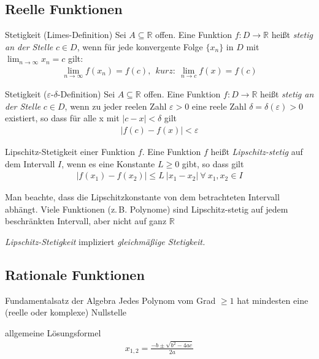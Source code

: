 \subsection{Reelle Funktionen}
\begin{karte}{Stetigkeit (Limes-Definition)}
	Sei \(A\subseteq\mathbb{R}\) offen. Eine Funktion \(f:D\to\mathbb{R}\) heißt \emph{stetig an der Stelle} \(c \in D\), wenn für jede konvergente Folge \(\{ x_{n} \} \) in \(D\) mit \(\displaystyle\lim_{n\to\infty} x_n = c\) gilt:
	\begin{align}
		\lim_{n\to\infty} f(x_n)=f(c),\ \ kurz:\ \lim_{n\to c}f(x)=f(c) 
	\end{align}
\end{karte}

\begin{karte}{Stetigkeit (\(\varepsilon\text{-}\delta \)-Definition)}
	Sei \(A\subseteq\mathbb{R}\) offen. Eine Funktion \(f:D\to\mathbb{R}\) heißt \emph{stetig an der Stelle} \(c \in D\), wenn zu jeder reelen Zahl \(\varepsilon > 0\) eine reele Zahl \(\delta=\delta(\varepsilon)>0\) existiert, so dass für alle x mit \(|c-x|<\delta \) gilt
	\begin{align}
		|f(c)-f(x)|<\varepsilon 
	\end{align}
	
\end{karte}

\begin{karte}{Lipschitz-Stetigkeit einer Funktion \(f\).}%
	Eine Funktion \(f\) heißt \emph{Lipschitz-stetig} auf dem Intervall \(I\), wenn es eine Konstante \(L\geq0\) gibt, so dass gilt
	\begin{align}
		\lvert f(x_1) - f(x_2) \rvert\leq L\ \lvert x_1 - x_2 \rvert\  \forall \  x_1,x_2\in I 
	\end{align}
	{\large Man beachte, dass die Lipschitzkonstante von dem betrachteten Intervall abhängt. Viele Funktionen (z.\,B. Polynome) sind Lipschitz-stetig auf jedem beschränkten Intervall, aber nicht auf ganz $\mathbb{R}$\par}
	\vspace{5mm}
	\emph{Lipschitz-Stetigkeit} impliziert \emph{gleichmäßige Stetigkeit.}
	
\end{karte}

\subsection{Rationale Funktionen}

\begin{karte}{Fundamentalsatz der Algebra}
	Jedes Polynom vom Grad \(\geq 1\) hat mindesten eine (reelle oder komplexe) Nullstelle
\end{karte}

\begin{karte}{allgemeine Lösungsformel}
	\begin{align}
		x_{1,2}=\frac{-b\pm\sqrt{b^2-4ac}}{2a} 
	\end{align}
\end{karte}
